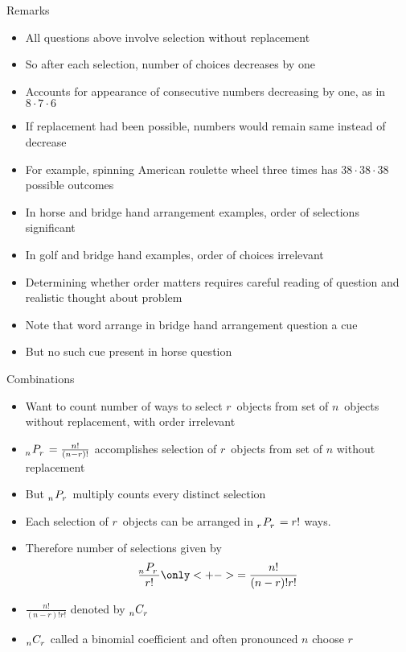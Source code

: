 \documentclass{beamer}
\theoremstyle{definition}
\newcommand\npr[2]{\tensor[_{#1}]P{_{#2}}}
\newcommand\ncr[2]{\tensor[_{#1}]C{_{#2}}}
\begin{document}
\begin{frame}{Remarks}
\begin{itemize}
\item All questions above involve selection \alert{without replacement}
\item So after each selection, number of choices decreases by one
\item Accounts for appearance of consecutive numbers decreasing
by one, as in $8\cdot 7\cdot 6$
\item If replacement had been possible, numbers would remain same
instead of decrease
\item For example, spinning American roulette wheel three times
has $38\cdot 38\cdot 38$ possible outcomes
\end{itemize}
\end{frame}
\begin{frame}
\begin{itemize}
\item In horse and bridge hand arrangement examples, order of selections
significant
\item In golf and bridge hand examples, order of choices irrelevant
\item Determining whether order matters requires careful reading of question
and realistic thought about problem
\item Note that word \alert{arrange} in bridge hand arrangement
question a \alert{cue}
\item But no such cue present in horse question
\end{itemize}
\end{frame}

\begin{frame}{Combinations}
\begin{itemize}
\item Want to count number
of ways to select $r$~objects from set of $n$~objects
without replacement, with order irrelevant
\item $\npr{n}{r}=\frac{n!}{\left(n-r\right)!}$
accomplishes selection of $r$~objects from set of $n$
without replacement
\item But $\npr{n}{r}$ multiply counts
every distinct selection
\item Each selection of $r$~objects can be arranged
in $\npr{r}{r}=r!$ ways.
\item Therefore number of selections
given by \[\frac{\npr{n}{r}}{r!}
\only<+->{=\frac{n!}{\left(n-r\right)!r!}}\]
\item
$\frac{n!}{\left(n-r\right)!r!}$ denoted by $\ncr{n}{r}$
\item $\ncr{n}{r}$ called a \alert{binomial coefficient}
and often pronounced \alert{$n$ choose $r$}
\end{itemize}
\end{frame}
\end{document}
